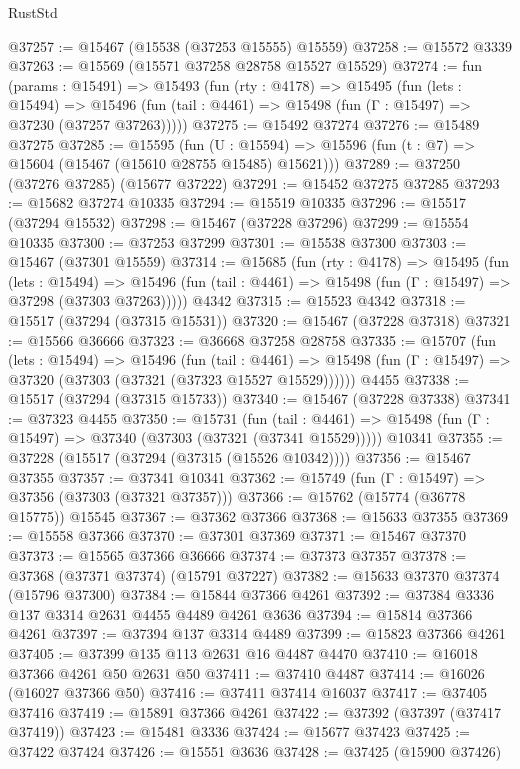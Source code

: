 \begin{lexlean}{RustStd}
\begin{coremodule}
@37257 := @15467 (@15538 (@37253 @15555) @15559)
@37258 := @15572 @3339
@37263 := @15569 (@15571 @37258 @28758 @15527 @15529)
@37274 := fun (params : @15491) =>
  @15493
    (fun (rty : @4178) =>
    @15495
      (fun (lets : @15494) =>
      @15496 (fun (tail : @4461) => @15498 (fun (Γ : @15497) => @37230 (@37257 @37263)))))
@37275 := @15492 @37274
@37276 := @15489 @37275
@37285 := @15595
    (fun (U : @15594) => @15596 (fun (t : @7) => @15604 (@15467 (@15610 @28755 @15485) @15621)))
@37289 := @37250 (@37276 @37285) (@15677 @37222)
@37291 := @15452 @37275 @37285
@37293 := @15682 @37274 @10335
@37294 := @15519 @10335
@37296 := @15517 (@37294 @15532)
@37298 := @15467 (@37228 @37296)
@37299 := @15554 @10335
@37300 := @37253 @37299
@37301 := @15538 @37300
@37303 := @15467 (@37301 @15559)
@37314 := @15685
    (fun (rty : @4178) =>
    @15495
      (fun (lets : @15494) =>
      @15496 (fun (tail : @4461) => @15498 (fun (Γ : @15497) => @37298 (@37303 @37263)))))
    @4342
@37315 := @15523 @4342
@37318 := @15517 (@37294 (@37315 @15531))
@37320 := @15467 (@37228 @37318)
@37321 := @15566 @36666
@37323 := @36668 @37258 @28758
@37335 := @15707
    (fun (lets : @15494) =>
    @15496
      (fun (tail : @4461) =>
      @15498 (fun (Γ : @15497) => @37320 (@37303 (@37321 (@37323 @15527 @15529))))))
    @4455
@37338 := @15517 (@37294 (@37315 @15733))
@37340 := @15467 (@37228 @37338)
@37341 := @37323 @4455
@37350 := @15731
    (fun (tail : @4461) => @15498 (fun (Γ : @15497) => @37340 (@37303 (@37321 (@37341 @15529)))))
    @10341
@37355 := @37228 (@15517 (@37294 (@37315 (@15526 @10342))))
@37356 := @15467 @37355
@37357 := @37341 @10341
@37362 := @15749 (fun (Γ : @15497) => @37356 (@37303 (@37321 @37357)))
@37366 := @15762 (@15774 (@36778 @15775)) @15545
@37367 := @37362 @37366
@37368 := @15633 @37355
@37369 := @15558 @37366
@37370 := @37301 @37369
@37371 := @15467 @37370
@37373 := @15565 @37366 @36666
@37374 := @37373 @37357
@37378 := @37368 (@37371 @37374) (@15791 @37227)
@37382 := @15633 @37370 @37374 (@15796 @37300)
@37384 := @15844 @37366 @4261
@37392 := @37384 @3336 @137 @3314 @2631 @4455 @4489 @4261 @3636
@37394 := @15814 @37366 @4261
@37397 := @37394 @137 @3314 @4489
@37399 := @15823 @37366 @4261
@37405 := @37399 @135 @113 @2631 @16 @4487 @4470
@37410 := @16018 @37366 @4261 @50 @2631 @50
@37411 := @37410 @4487
@37414 := @16026 (@16027 @37366 @50)
@37416 := @37411 @37414 @16037
@37417 := @37405 @37416
@37419 := @15891 @37366 @4261
@37422 := @37392 (@37397 (@37417 @37419))
@37423 := @15481 @3336
@37424 := @15677 @37423
@37425 := @37422 @37424
@37426 := @15551 @3636
@37428 := @37425 (@15900 @37426)

\end{coremodule}
\end{lexlean}
